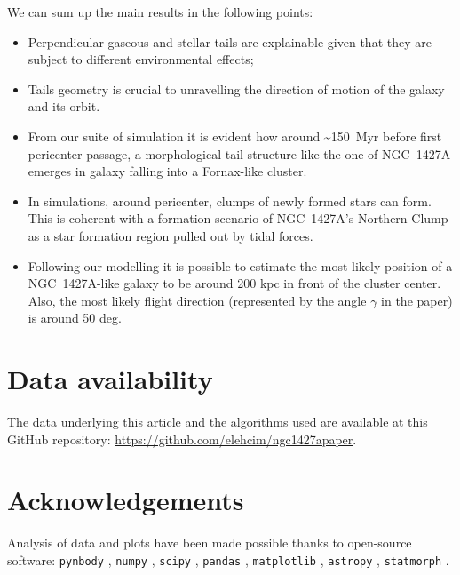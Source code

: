 We can sum up the main results in the following points:
\begin{itemize}
    \item Perpendicular gaseous and stellar tails are explainable given that they are subject to different environmental effects;
    \item Tails geometry is crucial to unravelling the direction of motion of the galaxy and its orbit.
    \item From our suite of simulation it is evident how around \textasciitilde 150~Myr before first pericenter passage, a morphological tail structure like the one of NGC~1427A emerges in galaxy falling into a Fornax-like cluster.
    \item In simulations, around pericenter, clumps of newly formed stars can form. This is coherent with a formation scenario of NGC~1427A's Northern Clump as a star formation region pulled out by tidal forces.
    \item Following our modelling it is possible to estimate the most likely position of a NGC~1427A-like galaxy to be around 200 kpc in front of the cluster center. Also, the most likely flight direction (represented by the angle $\gamma$ in the paper) is around 50 deg.
\end{itemize}

\section*{Data availability}
The data underlying this article and the algorithms used are available at this GitHub repository: \url{https://github.com/elehcim/ngc1427apaper}.

\section*{Acknowledgements}
Analysis of data and plots have been made possible thanks to open-source software:
\verb|pynbody| \citep{Pontzen2013},
\verb|numpy| \citep{numpy},
\verb|scipy| \citep{scipy},
\verb|pandas| \citep{pandas},
\verb|matplotlib| \citep{Hunter2004},
\verb|astropy| \citep{TheAstropyCollaboration2018},
\verb|statmorph| \citep{Rodriguez-Gomez2019}.
